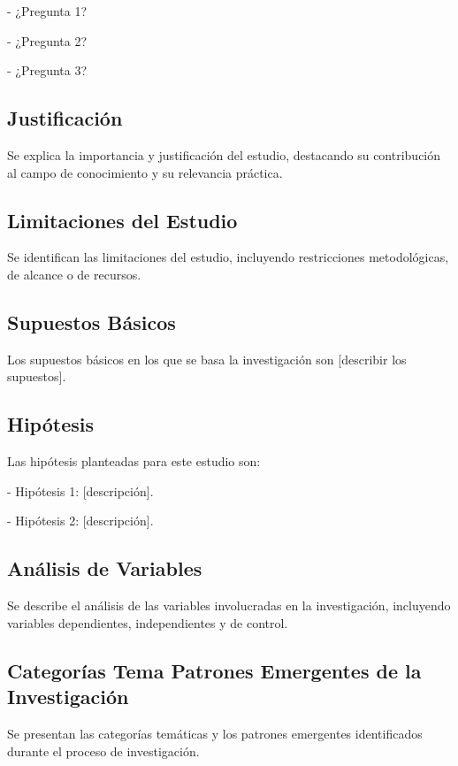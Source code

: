 - ¿Pregunta 1?

- ¿Pregunta 2?

- ¿Pregunta 3?

\subsection{Justificación}

Se explica la importancia y justificación del estudio, destacando su contribución al campo de conocimiento y su relevancia práctica.

\subsection{Limitaciones del Estudio}

Se identifican las limitaciones del estudio, incluyendo restricciones metodológicas, de alcance o de recursos.

\subsection{Supuestos Básicos}

Los supuestos básicos en los que se basa la investigación son [describir los supuestos].

\subsection{Hipótesis}

Las hipótesis planteadas para este estudio son:

- Hipótesis 1: [descripción].

- Hipótesis 2: [descripción].

\subsection{Análisis de Variables}

Se describe el análisis de las variables involucradas en la investigación, incluyendo variables dependientes, independientes y de control.

\subsection{Categorías Tema Patrones Emergentes de la Investigación}

Se presentan las categorías temáticas y los patrones emergentes identificados durante el proceso de investigación.